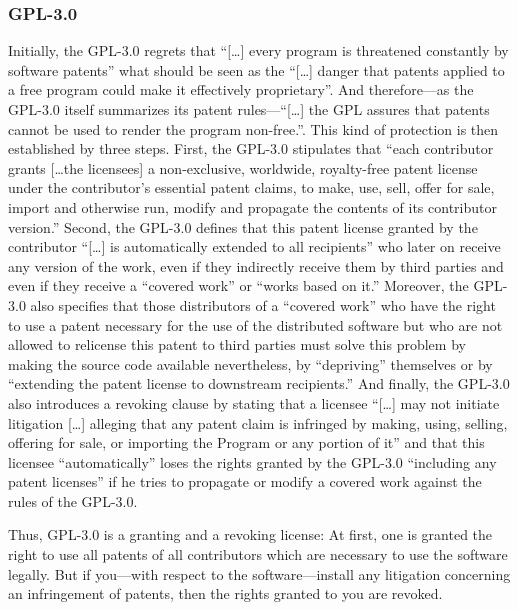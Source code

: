 \subsubsection {GPL-3.0}\label{subsec:Gpl30PatentClause}

Initially, the GPL-3.0 regrets that \enquote{[\ldots] every program is
threatened constantly by software patents} what should be seen as the
\enquote{[\ldots] danger that patents applied to a free program could make it
effectively proprietary}. And therefore---as the GPL-3.0 itself summarizes its
patent rules---\enquote{[\ldots] the GPL assures that patents cannot be used to
render the program non-free.}. This kind of protection is
then established by three steps. First, the GPL-3.0 stipulates that
\enquote{each contributor grants [\ldots the licensees] a non-exclusive,
worldwide, royalty-free patent license under the contributor's essential patent
claims, to make, use, sell, offer for sale, import and otherwise run, modify and
propagate the contents of its contributor version.}
Second, the GPL-3.0 defines that this patent license granted by the contributor
\enquote{[\ldots] is automatically extended to all recipients} who later on
receive any version of the work, even if they indirectly receive them by third
parties and even if they receive a \enquote{covered work} or \enquote{works
based on it.} Moreover, the GPL-3.0 also specifies that those
distributors of a \enquote{covered work} who have the right to use a patent
necessary for the use of the distributed software but who are not allowed to
relicense this patent to third parties must solve this problem by making the
source code available nevertheless, by \enquote{depriving} themselves or by
\enquote{extending the patent license to downstream recipients.} 
And finally, the GPL-3.0 also introduces a revoking clause by stating that a
licensee \enquote{[\ldots] may not initiate litigation [\ldots] alleging that
any patent claim is infringed by making, using, selling, offering for sale, or
importing the Program or any portion of it} and that this
licensee \enquote{automatically} loses the rights granted by the GPL-3.0
\enquote{including any patent licenses} if he tries to propagate or modify a
covered work against the rules of the GPL-3.0.

Thus, GPL-3.0 is a granting and a revoking license: At first, one is granted the
right to use all patents of all contributors which are necessary to use the
software legally. But if you---with respect to the software---install any
litigation concerning an infringement of patents, then the rights granted to you
are revoked. 


